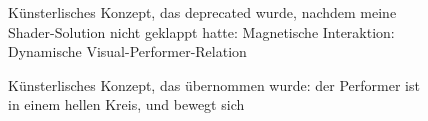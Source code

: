 \begin{figure}[htbp]
    \centering
    \caption{Künsterlisches Konzept, das deprecated wurde, nachdem meine Shader-Solution nicht geklappt hatte: Magnetische Interaktion: Dynamische Visual-Performer-Relation}
    \label{fig:magnetic_interaction}
\end{figure}

\begin{figure}[htbp]
    \centering
    \caption{Künsterlisches Konzept, das übernommen wurde: der Performer ist in einem hellen Kreis, und bewegt sich}
    \label{fig:movement_responsive}
\end{figure}

